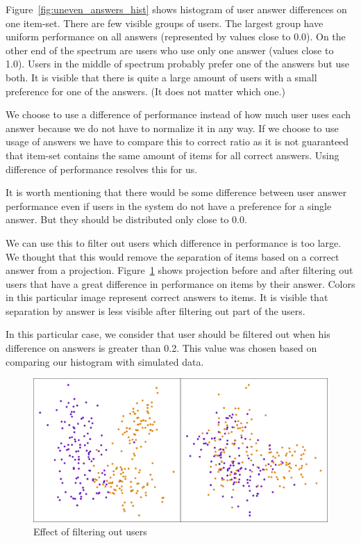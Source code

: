 \documentclass[
  print, %
  table,   %
  nolof,     %
  nolot,     %
  nocover,
  color,
  final,
]{fithesis3}
\begin{document}
Figure~\ref{fig:uneven_answers_hist} shows histogram of user answer differences on one item-set. There are few visible groups of users. The largest group have uniform performance on all answers (represented by values close to 0.0). On the other end of the spectrum are users who use only one answer (values close to 1.0). Users in the middle of spectrum probably prefer one of the answers but use both. It is visible that there is quite a large amount of users with a small preference for one of the answers. (It does not matter which one.)


We choose to use a difference of performance instead of how much user uses each answer because we do not have to normalize it in any way. If we choose to use usage of answers we have to compare this to correct ratio as it is not guaranteed that item-set contains the same amount of items for all correct answers. Using difference of performance resolves this for us.


It is worth mentioning that there would be some difference between user answer performance even if users in the system do not have a preference for a single answer. But they should be distributed only close to 0.0.

We can use this to filter out users which difference in performance is too large. We thought that this would remove the separation of items based on a correct answer from a projection. Figure~\ref{fig:answers_normalization} shows projection before and after filtering out users that have a great difference in performance on items by their answer. Colors in this particular image represent correct answers to items. It is visible that separation by answer is less visible after filtering out part of the users.

In this particular case, we consider that user should be filtered out when his difference on answers is greater than 0.2. This value was chosen based on comparing our histogram with simulated data.

\begin{figure}
  \includegraphics[width=\textwidth]{img/answers_normalization}
  \caption{Effect of filtering out users}
  \label{fig:answers_normalization}
\end{figure}
\end{document}
